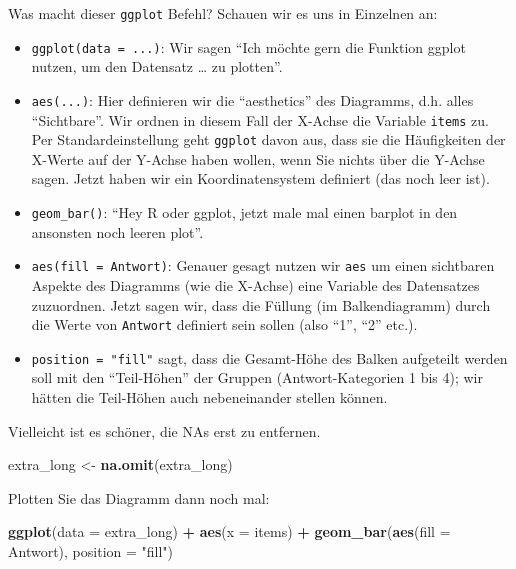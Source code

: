 \documentclass[12pt,ngerman,]{book}
\makeatletter
\newenvironment{Shaded}{\begin{snugshade}}{\end{snugshade}}
\newcommand{\KeywordTok}[1]{\textcolor[rgb]{0.13,0.29,0.53}{\textbf{#1}}}
\newcommand{\DataTypeTok}[1]{\textcolor[rgb]{0.13,0.29,0.53}{#1}}
\newcommand{\StringTok}[1]{\textcolor[rgb]{0.31,0.60,0.02}{#1}}
\newcommand{\OperatorTok}[1]{\textcolor[rgb]{0.81,0.36,0.00}{\textbf{#1}}}
\newcommand{\NormalTok}[1]{#1}
\providecommand{\tightlist}{%
  \setlength{\itemsep}{0pt}\setlength{\parskip}{0pt}}
\newenvironment{kframe}{%
\medskip{}
\setlength{\fboxsep}{.8em}
 \def\at@end@of@kframe{}%
 \ifinner\ifhmode%
  \def\at@end@of@kframe{\end{minipage}}%
  \begin{minipage}{\columnwidth}%
 \fi\fi%
 \def\FrameCommand##1{\hskip\@totalleftmargin \hskip-\fboxsep
 \colorbox{shadecolor}{##1}\hskip-\fboxsep
     \hskip-\linewidth \hskip-\@totalleftmargin \hskip\columnwidth}%
 \MakeFramed {\advance\hsize-\width
   \@totalleftmargin\z@ \linewidth\hsize
   \@setminipage}}%
 {\par\unskip\endMakeFramed%
 \at@end@of@kframe}
\renewenvironment{Shaded}{\begin{kframe}}{\end{kframe}}
\theoremstyle{definition}
\theoremstyle{definition}
\theoremstyle{remark}
\makeatother
\begin{document}
Was macht dieser \texttt{ggplot} Befehl? Schauen wir es uns in Einzelnen
an:

\begin{itemize}
\tightlist
\item
  \texttt{ggplot(data\ =\ ...)}: Wir sagen ``Ich möchte gern die
  Funktion ggplot nutzen, um den Datensatz \ldots{} zu plotten''.
\item
  \texttt{aes(...)}: Hier definieren wir die ``aesthetics'' des
  Diagramms, d.h. alles ``Sichtbare''. Wir ordnen in diesem Fall der
  X-Achse die Variable \texttt{items} zu. Per Standardeinstellung geht
  \texttt{ggplot} davon aus, dass sie die Häufigkeiten der X-Werte auf
  der Y-Achse haben wollen, wenn Sie nichts über die Y-Achse sagen.
  Jetzt haben wir ein Koordinatensystem definiert (das noch leer ist).
\item
  \texttt{geom\_bar()}: ``Hey R oder ggplot, jetzt male mal einen
  barplot in den ansonsten noch leeren plot''.
\item
  \texttt{aes(fill\ =\ Antwort)}: Genauer gesagt nutzen wir \texttt{aes}
  um einen sichtbaren Aspekte des Diagramms (wie die X-Achse) eine
  Variable des Datensatzes zuzuordnen. Jetzt sagen wir, dass die Füllung
  (im Balkendiagramm) durch die Werte von \texttt{Antwort} definiert
  sein sollen (also ``1'', ``2'' etc.).
\item
  \texttt{position\ =\ "fill"} sagt, dass die Gesamt-Höhe des Balken
  aufgeteilt werden soll mit den ``Teil-Höhen'' der Gruppen
  (Antwort-Kategorien 1 bis 4); wir hätten die Teil-Höhen auch
  nebeneinander stellen können.
\end{itemize}

Vielleicht ist es schöner, die NAs erst zu entfernen.

\begin{Shaded}
\begin{Highlighting}[]
\NormalTok{extra_long <-}\StringTok{ }\KeywordTok{na.omit}\NormalTok{(extra_long)}
\end{Highlighting}
\end{Shaded}

Plotten Sie das Diagramm dann noch mal:

\begin{Shaded}
\begin{Highlighting}[]
\KeywordTok{ggplot}\NormalTok{(}\DataTypeTok{data =}\NormalTok{ extra_long) }\OperatorTok{+}
\StringTok{  }\KeywordTok{aes}\NormalTok{(}\DataTypeTok{x =}\NormalTok{ items)  }\OperatorTok{+}
\StringTok{  }\KeywordTok{geom_bar}\NormalTok{(}\KeywordTok{aes}\NormalTok{(}\DataTypeTok{fill =}\NormalTok{ Antwort), }\DataTypeTok{position =} \StringTok{"fill"}\NormalTok{) }
\end{Highlighting}
\end{Shaded}
\end{document}
